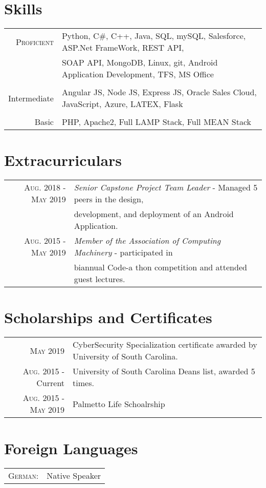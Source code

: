 \documentclass[a4paper,10pt]{article}
\begin{document}
\section{Skills}
\begin{tabular}{r|l}
\textsc{Proficient     }& Python, C\#, C++, Java, SQL, mySQL, Salesforce, ASP.Net FrameWork, REST API,\\& SOAP API, MongoDB, Linux, git, Android Application Development, TFS, MS Office\\ 
\\
Intermediate &  Angular JS, Node JS, Express JS, Oracle Sales Cloud, JavaScript, Azure, LATEX, Flask \\\\
 Basic & PHP, Apache2, Full LAMP Stack, Full MEAN Stack 

\end{tabular}

\section{Extracurriculars}
\begin{tabular}{r|l}
 \textsc{Aug.} 2018 - \textsc{May} 2019  &  \emph{Senior Capstone Project Team Leader} - Managed 5 peers in the design, \\& development, and deployment of an Android Application. 
\\
 \textsc{Aug.} 2015 - \textsc{May} 2019   & \emph{Member of the Association of Computing Machinery} - participated in \\& biannual Code-a thon competition and attended guest lectures. \\
\end{tabular}

\section{Scholarships and Certificates}
\begin{tabular}{r|l}
 \textsc{May} 2019  & CyberSecurity Specialization certificate awarded by University of South Carolina. \\
  \textsc{Aug.} 2015 - Current  & University of South Carolina Deans list, awarded 5 times.\\
 \textsc{Aug.} 2015 - \textsc{May} 2019   & Palmetto Life Schoalrship\normalsize


\end{tabular}

\section{Foreign Languages}
\begin{tabular}{r|l}
\textsc{German:}&Native Speaker\\
\end{tabular}
\end{document}
